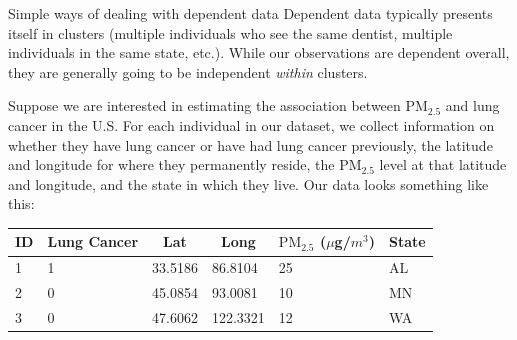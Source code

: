 \documentclass[10pt,t]{beamer}
\begin{document}
\begin{frame}{Simple ways of dealing with dependent data}
Dependent data typically presents itself in clusters (multiple individuals who see the same dentist, multiple individuals in the same state, etc.). While our observations are dependent overall, they are generally going to be independent \textit{within} clusters. 

\vspace{0.3cm}

\pause Suppose we are interested in estimating the association between $\text{PM}_{2.5}$ and lung cancer in the U.S. For each individual in our dataset, we collect information on whether they have lung cancer or have had lung cancer previously, the latitude and longitude for where they permanently reside, the $\text{PM}_{2.5}$ level at that latitude and longitude, and the state in which they live. Our data looks something like this:

\vspace{0.3cm}

\begin{table}[]
	\begin{tabular}{l|l|l|l|l|l}
		\multicolumn{1}{c|}{ID} & \multicolumn{1}{c|}{Lung Cancer} & \multicolumn{1}{c|}{Lat} & \multicolumn{1}{c|}{Long} & \multicolumn{1}{c|}{$\text{PM}_{2.5}$ ($\mu$g/$m^3$)} & \multicolumn{1}{c}{State} \\ \hline
		1                                   & 1                                & 33.5186                  & 86.8104                   & 25                          & AL                   \\
		2                                   & 0                                & 45.0854                  & 93.0081                   & 10                          & MN                \\
		3                                   & 0                                & 47.6062                  & 122.3321                  & 12                          & WA             
	\end{tabular}
\end{table}

\end{frame}
\end{document}
